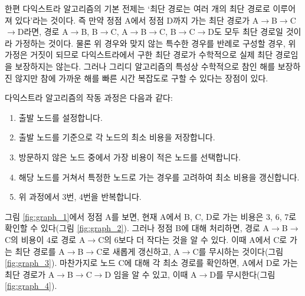 \documentclass{article}
\begin{document}
한편 다익스트라 알고리즘의 기본 전제는 `최단 경로는 여러 개의 최단 경로로 이루어져 있다'라는 것이다. 즉 만약 정점 A에서 정점 D까지 가는 최단 경로가 A$\rightarrow$B$\rightarrow$C$\rightarrow$D라면, 경로 A$\rightarrow$B, B$\rightarrow$C, A$\rightarrow$B$\rightarrow$C, B$\rightarrow$C$\rightarrow$D도 모두 최단 경로일 것이라 가정하는 것이다. 물론 위 경우와 맞지 않는 특수한 경우를 반례로 구성할 경우, 위 가정은 거짓이 되므로 다익스트라에서 구한 최단 경로가 수학적으로 실제 최단 경로임을 보장하지는 않는다. 그러나 그리디 알고리즘의 특성상 수학적으로 참인 해를 보장하진 않지만 참에 가까운 해를 빠른 시간 복잡도로 구할 수 있다는 장점이 있다.

다익스트라 알고리즘의 작동 과정은 다음과 같다:
\begin{enumerate}
    \item 출발 노드를 설정합니다.
    \item 출발 노드를 기준으로 각 노드의 최소 비용을 저장합니다.
    \item 방문하지 않은 노드 중에서 가장 비용이 적은 노드를 선택합니다.
    \item 해당 노드를 거쳐서 특정한 노드로 가는 경우를 고려하여 최소 비용을 갱신합니다.
    \item 위 과정에서 3번, 4번을 반복합니다.
\end{enumerate}

그림 \ref{fig:graph_1}에서 정점 A를 보면, 현재 A에서 B, C, D로 가는 비용은 3, 6, 7로 확인할 수 있다(그림 \ref{fig:graph_2}). 그러나 정점 B에 대해 처리하면, 경로 A$\rightarrow$B$\rightarrow$C의 비용이 4로 경로 A$\rightarrow$C의 6보다 더 작다는 것을 알 수 있다. 이때 A에서 C로 가는 최단 경로를 A$\rightarrow$B$\rightarrow$C로 새롭게 갱신하고, A$\rightarrow$C를 무시하는 것이다(그림 \ref{fig:graph_3}). 마찬가지로 노드 C에 대해 각 최소 경로를 확인하면, A에서 D로 가는 최단 경로가 A$\rightarrow$B$\rightarrow$C$\rightarrow$D 임을 알 수 있고, 이때 A$\rightarrow$D를 무시한다(그림 \ref{fig:graph_4}).
\end{document}
